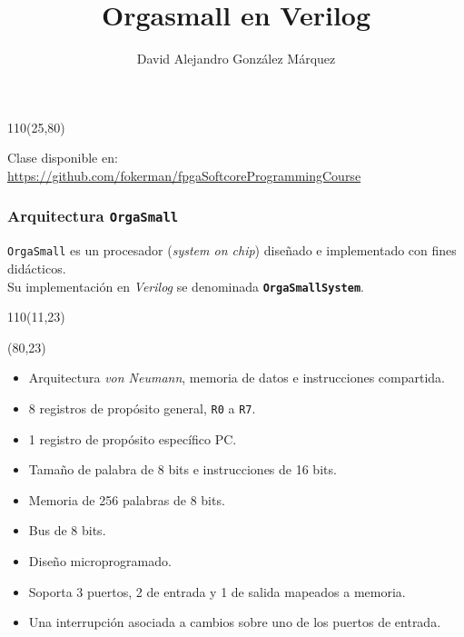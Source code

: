 \documentclass[aspectratio=169]{beamer}
\title{\Huge Orgasmall en Verilog}
\author{David Alejandro González Márquez}
\date{}
\begin{document}
\begin{frame}[plain]
    \titlepage
    \begin{textblock}{110}(25,80)
    \begin{tcolorbox}[size=small,width=\textwidth,colback={gray!30},title={}]
    \begin{center}
     \scriptsize Clase disponible en: \url{https://github.com/fokerman/fpgaSoftcoreProgrammingCourse}
    \end{center}
    \end{tcolorbox}
    \end{textblock}
\end{frame}

\begin{frame}[fragile,t]
    \frametitle{Arquitectura \texttt{OrgaSmall}}
    \texttt{OrgaSmall} es un procesador (\emph{system on chip}) diseñado e implementado con fines didácticos.\\
    \textcolor{verdeuca}{Su implementación en \emph{Verilog} se denominada \textbf{\texttt{OrgaSmallSystem}}.}\\
    \begin{textblock}{110}(11,23)
    \end{textblock}
    \begin{textblock}{70}(80,23)
    \begin{itemize}
    \setlength\itemsep{0em}
    \item<2-> Arquitectura \emph{von Neumann}, memoria de datos e instrucciones compartida.
    \item<3-> 8 registros de propósito general, \texttt{R0} a \texttt{R7}.
    \item<3-> 1 registro de propósito específico PC.
    \item<4-> Tamaño de palabra de 8 bits e instrucciones de 16 bits.
    \item<4-> Memoria de 256 palabras de 8 bits.
    \item<5-> Bus de 8 bits.
    \item<5-> Diseño microprogramado.
    \item<6-> Soporta 3 puertos, 2 de entrada y 1 de salida mapeados a memoria.
    \item<6-> Una interrupción asociada a cambios sobre uno de los puertos de entrada.
    \end{itemize}
    \end{textblock}
\end{frame}
\end{document}
